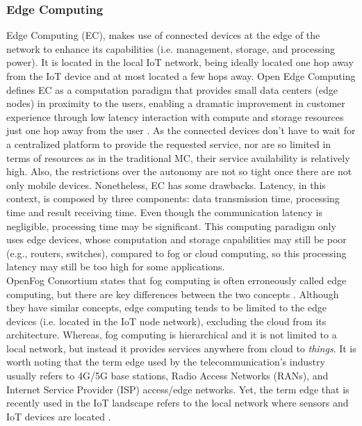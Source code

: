 \subsubsection{Edge Computing}
Edge Computing (EC), makes use of connected devices at the edge of the network to enhance its capabilities (i.e. management, storage, and processing power). It is located in the local IoT network, being ideally located one hop away from the IoT device and at most located a few hops away. Open Edge Computing defines EC as a computation paradigm that provides small data centers (edge nodes) in proximity to the users, enabling a dramatic improvement in customer experience through low latency interaction with compute and storage resources just one hop away from the user \cite{OpenEdge73:online}. As the connected devices don't have to wait for a centralized platform to provide the requested service, nor are so limited in terms of resources as in the traditional MC, their service availability is relatively high. Also, the restrictions over the autonomy are not so tight once there are not only mobile devices. Nonetheless, EC has some drawbacks. Latency, in this context, is composed by three components: data transmission time, processing time and result receiving time. Even though the communication latency is negligible, processing time may be significant. This computing paradigm only uses edge devices, whose computation and storage capabilities may still be poor (e.g., routers, switches), compared to fog or cloud computing, so this processing latency may still be too high for some applications.\\
\noindent\tab OpenFog Consortium states that fog computing is often erroneously called edge computing, but there are key differences between the two concepts \cite{OpenFog0208}. Although they have similar concepts, edge computing tends to be limited to the edge devices (i.e. located in the IoT node network), excluding the cloud from its architecture. Whereas, fog computing is hierarchical and it is not limited to a local network, but instead it provides services anywhere from cloud to \textit{things}. It is worth noting that the term edge used by the telecommunication's industry usually refers to 4G/5G base stations, Radio Access Networks (RANs), and Internet Service Provider (ISP) access/edge networks. Yet, the term edge that is recently used in the IoT landscape refers to the local network where sensors and IoT devices are located \cite{yousefpour2018all}.

